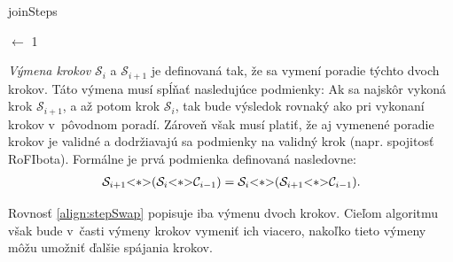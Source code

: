 \documentclass[
  printed, %
  oneside, %
  notable,   %
  nolof,     %
  nolot,     %
]{fithesis3}
\begin{document}
\begin{algorithm}
    \caption{joinSteps}
    \label{algorithm:stepJoin}
    \DontPrintSemicolon
    
    \CurrIndex $\leftarrow$ 1\;
\end{algorithm}

\textit{Výmena krokov} $\mathcal{S}_i$ a $\mathcal{S}_{i + 1}$ je definovaná tak, že sa vymení poradie týchto dvoch krokov. Táto výmena musí spĺňať nasledujúce podmienky: Ak sa najskôr vykoná krok $\mathcal{S}_{i + 1}$, a až potom krok $\mathcal{S}_i$, tak bude výsledok rovnaký ako pri vykonaní krokov v~pôvodnom poradí. Zároveň však musí platiť, že aj vymenené poradie krokov je validné a dodržiavajú sa podmienky na validný krok (napr. spojitosť RoFIbota). Formálne je prvá podmienka definovaná nasledovne: 
\begin{align}
\label{align:stepSwap}
\mathcal{S}_{i + 1} \lstinline{<*>} (\mathcal{S}_i \lstinline{<*>} \mathcal{C}_{i - 1}) = \mathcal{S}_i \lstinline{<*>} (\mathcal{S}_{i + 1} \lstinline{<*>} \mathcal{C}_{i - 1}). 
\end{align}

Rovnosť \ref{align:stepSwap} popisuje iba výmenu dvoch krokov. Cieľom algoritmu však bude v~časti výmeny krokov vymeniť ich viacero, nakoľko tieto výmeny môžu umožniť ďalšie spájania krokov. 
\end{document}
